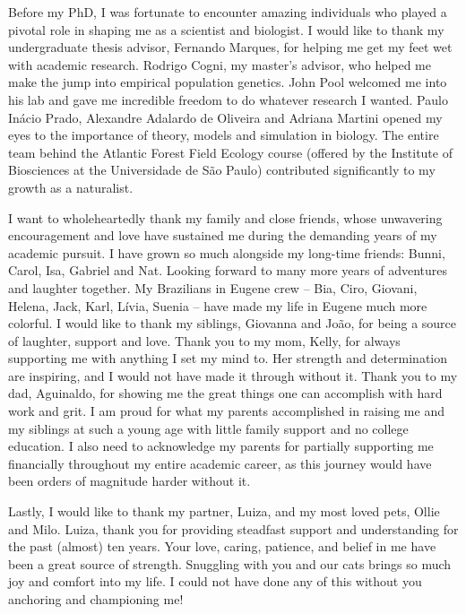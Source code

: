 {Before my PhD, I was fortunate to encounter amazing individuals who played a pivotal role in shaping me as a scientist and biologist.
I would like to thank my undergraduate thesis advisor, Fernando Marques, for helping me get my feet wet with academic research.
Rodrigo Cogni, my master's advisor, who helped me make the jump into empirical population genetics.
John Pool welcomed me into his lab and gave me incredible freedom to do whatever research I wanted.
Paulo Inácio Prado, Alexandre Adalardo de Oliveira and Adriana Martini opened my eyes to the importance of theory, models and simulation in biology.
The entire team behind the Atlantic Forest Field Ecology course (offered by the Institute of Biosciences at the Universidade de São Paulo) contributed significantly to my growth as a naturalist.

I want to wholeheartedly thank my family and close friends,
whose unwavering encouragement and love have sustained me during the demanding years of my academic pursuit.
I have grown so much alongside my long-time friends: Bunni, Carol, Isa, Gabriel and Nat.
Looking forward to many more years of adventures and laughter together.
My Brazilians in Eugene crew -- Bia, Ciro, Giovani, Helena, Jack, Karl, Lívia, Suenia -- have made my life in Eugene much more colorful.
I would like to thank my siblings, Giovanna and João, for being a source of laughter, support and love.
Thank you to my mom, Kelly, for always supporting me with anything I set my mind to.
Her strength and determination are inspiring, and I would not have made it through without it.
Thank you to my dad, Aguinaldo, for showing me the great things one can accomplish with hard work and grit.
I am proud for what my parents accomplished in raising me and my siblings
at such a young age with little family support and no college education.
I also need to acknowledge my parents for partially supporting me financially throughout my entire academic career,
as this journey would have been orders of magnitude harder without it.


Lastly, I would like to thank my partner, Luiza, and my most loved pets, Ollie and Milo.
Luiza, thank you for providing steadfast support and understanding for the past (almost) ten years.
Your love, caring, patience, and belief in me have been a great source of strength.
Snuggling with you and our cats brings so much joy and comfort into my life.
I could not have done any of this without you anchoring and championing me!


}

